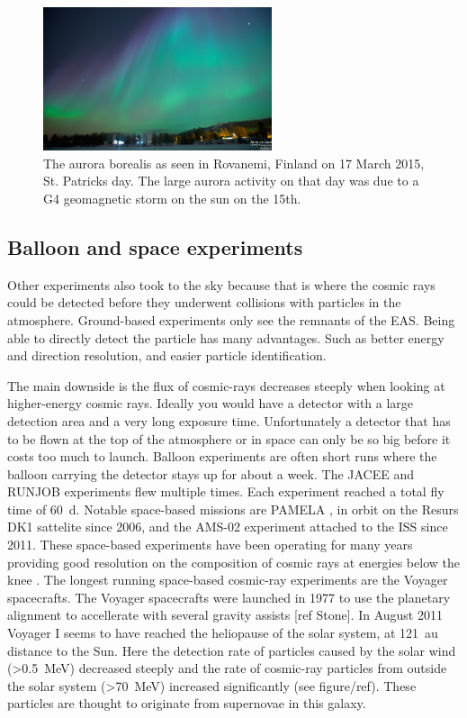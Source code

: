 \begin{figure}
    \centering
    \includegraphics[width=0.6\textwidth]{plots/cosmic-rays/aurora.png}
    \caption{The aurora borealis as seen in Rovanemi, Finland on 17 March 2015, St. Patricks day. The large aurora activity on that day was due to a G4 geomagnetic storm on the sun on the 15th.}
    \label{fig:aurora}
\end{figure}


\subsection{Balloon and space experiments}

Other experiments also took to the sky because that is where the cosmic rays could be detected before they underwent collisions with particles in the atmosphere. Ground-based experiments only see the remnants of the EAS. Being able to directly detect the particle has many advantages. Such as better energy and direction resolution, and easier particle identification.

The main downside is the flux of cosmic-rays decreases steeply when looking at higher-energy cosmic rays. Ideally you would have a detector with a large detection area and a very long exposure time. Unfortunately a detector that has to be flown at the top of the atmosphere or in space can only be so big before it costs too much to launch. Balloon experiments are often short runs where the balloon carrying the detector stays up for about a week. The JACEE \cite{asakimori1998jacee} and RUNJOB \cite{hareyama2011runjob} experiments flew multiple times. Each experiment reached a total fly time of \SI{60}{\day}. Notable space-based missions are PAMELA \cite{adriani2014pamela}, in orbit on the Resurs DK1 sattelite since 2006, and the AMS-02 \cite{casaus2014ams} experiment attached to the ISS since 2011. These space-based experiments have been operating for many years providing good resolution on the composition of cosmic rays at energies below the knee \cite{kulikov1958knee}. The longest running space-based cosmic-ray experiments are the Voyager spacecrafts. The Voyager spacecrafts were launched in 1977 to use the planetary alignment to accellerate with several gravity assists [ref Stone]. In August 2011 Voyager I seems to have reached the heliopause of the solar system, at \SI{121}{\astronomicalunit} distance to the Sun. Here the detection rate of particles caused by the solar wind (>\SI{0.5}{\MeV}) decreased steeply and the rate of cosmic-ray particles from outside the solar system (>\SI{70}{\MeV}) increased significantly (see figure/ref). These particles are thought to originate from supernovae in this galaxy.


